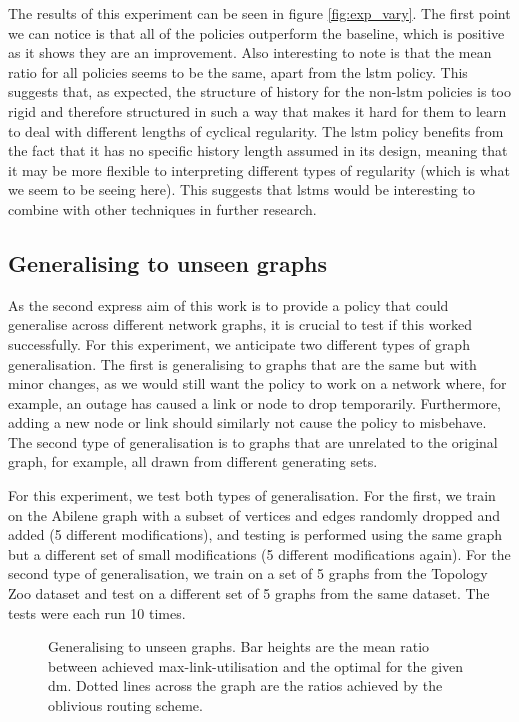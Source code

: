 The results of this experiment can be seen in figure \ref{fig:exp_vary}. The first point we can notice is that all of the policies outperform the baseline, which is positive as it shows they are an improvement. Also interesting to note is that the mean ratio for all policies seems to be the same, apart from the \ac{lstm} policy. This suggests that, as expected, the structure of history for the non-\ac{lstm} policies is too rigid and therefore structured in such a way that makes it hard for them to learn to deal with different lengths of cyclical regularity. The \ac{lstm} policy benefits from the fact that it has no specific history length assumed in its design, meaning that it may be more flexible to interpreting different types of regularity (which is what we seem to be seeing here). This suggests that \acp{lstm} would be interesting to combine with other techniques in further research.

\subsection{Generalising to unseen graphs}
As the second express aim of this work is to provide a policy that could generalise across different network graphs, it is crucial to test if this worked successfully. For this experiment, we anticipate two different types of graph generalisation. The first is generalising to graphs that are the same but with minor changes, as we would still want the policy to work on a network where, for example, an outage has caused a link or node to drop temporarily. Furthermore, adding a new node or link should similarly not cause the policy to misbehave. The second type of generalisation is to graphs that are unrelated to the original graph, for example, all drawn from different generating sets.

For this experiment, we test both types of generalisation. For the first, we train on the Abilene graph with a subset of vertices and edges randomly dropped and added (5 different modifications), and testing is performed using the same graph but a different set of small modifications (5 different modifications again). For the second type of generalisation, we train on a set of 5 graphs from the Topology Zoo dataset and test on a different set of 5 graphs from the same dataset. The tests were each run 10 times.

\begin{figure}
    \centering
    \resizebox{\textwidth}{!}{}
    \caption{Generalising to unseen graphs. Bar heights are the mean ratio between achieved max-link-utilisation and the optimal for the given \ac{dm}. Dotted lines across the graph are the ratios achieved by the oblivious routing scheme.}
    \label{fig:exp_graphs}
\end{figure}

